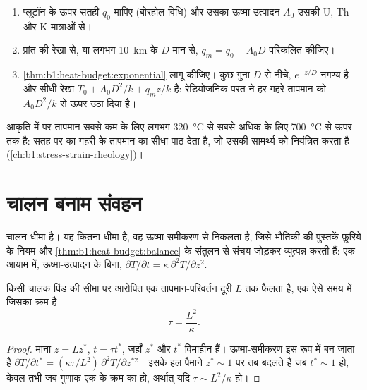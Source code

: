 \begin{method}[प्लूटॉन के नीचे गहराई पर तापमान]\label{met:b1:heat-budget:moho}
\begin{enumerate}
  \item प्लूटॉन के ऊपर सतही  $q_0$ मापिए (बोरहोल विधि) और उसका ऊष्मा-उत्पादन $A_0$ उसकी U, Th और K मात्राओं से।
  \item प्रांत की रेखा से, या लगभग \qty{10}{km} के $D$ मान से, $q_m = q_0 - A_0 D$ परिकलित कीजिए।
  \item \cref{thm:b1:heat-budget:exponential} लागू कीजिए। कुछ गुना $D$ से नीचे, $e^{-z/D}$ नगण्य है और  सीधी रेखा $T_0 + A_0D^2/k + q_m z/k$ है: रेडियोजनिक परत ने हर गहरे तापमान को $A_0D^2/k$ से ऊपर उठा दिया है।
\end{enumerate}
\end{method}

आकृति में  पर तापमान सबसे कम  के लिए लगभग \qty{320}{\degreeCelsius} से सबसे अधिक के लिए \qty{700}{\degreeCelsius} से ऊपर तक है: सतह पर का  गहरी  के तापमान का सीधा पाठ देता है, जो उसकी सामर्थ्य को नियंत्रित करता है (\cref{ch:b1:stress-strain-rheology})।

\section{चालन बनाम संवहन}

चालन धीमा है। यह कितना धीमा है, वह ऊष्मा-समीकरण से निकलता है, जिसे भौतिकी की पुस्तकें फ़ूरिये के नियम और \cref{thm:b1:heat-budget:balance} के संतुलन से संचय जोड़कर व्युत्पन्न करती हैं: एक आयाम में, ऊष्मा-उत्पादन के बिना,
$\partial T/\partial t = \kappa\,\partial^2 T/\partial z^2$.

\begin{proposition}[चालन का समय-पैमाना]\label{prop:b1:heat-budget:timescale}
किसी चालक पिंड की सीमा पर आरोपित एक तापमान-परिवर्तन दूरी $L$ तक फैलता है, एक ऐसे समय में जिसका क्रम है
\[
  \tau = \frac{L^2}{\kappa} .
\]
\end{proposition}

\begin{proof}
माना $z = L z^*$, $t = \tau t^*$, जहाँ $z^*$ और $t^*$ विमाहीन हैं। ऊष्मा-समीकरण इस रूप में बन जाता है $\partial T/\partial t^* = (\kappa\tau/L^2)\,\partial^2
T/\partial z^{*2}$। इसके हल पैमाने $z^* \sim 1$ पर तब बदलते हैं जब $t^* \sim 1$ हो, केवल तभी जब गुणांक एक के क्रम का हो, अर्थात् यदि $\tau \sim L^2/\kappa$ हो।
\end{proof}

